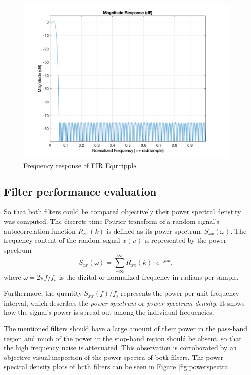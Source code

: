 \begin{figure}[H]
	\centering
	\includegraphics[width=\linewidth, trim={2.5cm, 1cm, 4cm, 1cm}, clip]{Figures/equiripple.png}
	\caption{Frequency response of FIR Equiripple.}
	\label{fig:equiripple}
\end{figure}


\subsection{Filter performance evaluation}
So that both filters could be compared objectively their power spectral denstity was computed. The discrete-time Fourier transform of a random signal's autocorrelation function $R_{xx}(k)$ is defined as its power spectrum $S_{xx}(\omega)$. The frequency content of the random signal $x(n)$ is represented by the power spectrum 
\begin{equation}
	S_{xx}(\omega) = \sum_{-\infty}^{\infty} R_{xx}(k)\cdot e^{-j\omega k},
\end{equation}
where $\omega = 2\pi f/f_s$ is the digital or normalized frequency in radians per sample.

Furthermore, the quantity $S_{xx}(f)/f_s$ represents the power per unit frequency interval, which describes the \emph{power spectrum} or \emph{power spectrum density}. It shows how the signal's power is spread out among the individual frequencies. \cite{orfanidis_introduction_1996}

The mentioned filters should have a large amount of their power in the pass-band region and much of the power in the stop-band region should be absent, so that the high frequency noise is attenuated. This observation is corroborated by an objective visual inspection of the power spectra of both filters. The power spectral density plots of both filters can be seen in Figure \ref{fig:powerspectra}.

